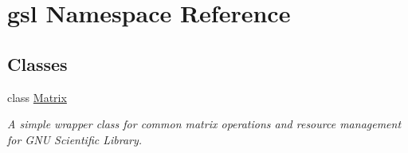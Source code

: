 \hypertarget{namespacegsl}{\section{gsl Namespace Reference}
\label{namespacegsl}
}
\subsection*{Classes}
\begin{DoxyCompactItemize}
\item 
class \hyperlink{classgsl_1_1_matrix}{Matrix}
\begin{DoxyCompactList}\small\item\em A simple wrapper class for common matrix operations and resource management for G\+N\+U Scientific Library. \end{DoxyCompactList}\end{DoxyCompactItemize}
